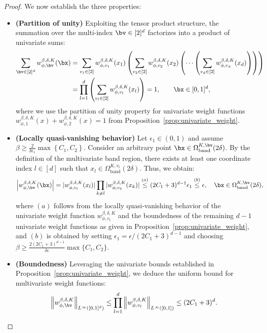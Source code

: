 \documentclass[11pt]{article}
\begin{document}
\begin{proof}
    We now establish the three properties: 
    \begin{itemize}
        \item \textbf{(Partition of unity)} Exploiting the tensor product structure, the summation over the multi-index $\bv \in [2]^d$ factorizes into a product of univariate sums:
        \begin{equation*}
            \begin{aligned}
                \sum_{\bv \in [2]^d} w_{\phi,\bv}^{\beta, \delta, K}(\bx) & = \sum_{v_1 \in [2]} w_{\phi, v_1}^{\beta, \delta, K}(x_1) \left( \sum_{v_2 \in [2]} w_{\phi, v_2}^{\beta, \delta, K}(x_2) \left( \cdots \left(\sum_{v_d \in [2]} w_{\phi, v_d}^{\beta, \delta, K}(x_d)  \right)\right) \right) \\
                & = \prod_{l=1}^d \left(\sum_{v_l \in [2]} w_{\phi, v_l}^{\beta, \delta, K}(x_l)\right) = 1, \qquad \bx \in [0,1]^d,
            \end{aligned}
        \end{equation*}
        where we use the partition of unity property for univariate weight functions $w_{\phi, 1}^{\beta, \delta, K}(x) + w_{\phi, 2}^{\beta, \delta, K}(x) = 1$ from Proposition~\ref{prop:univariate_weight}.
        \item \textbf{(Locally quasi-vanishing behavior)} Let $\epsilon_1 \in (0,1)$ and assume $\beta \ge \frac{2}{\delta \epsilon_1} \max \left\{ C_1,C_2 \right\}$. Consider an arbitrary point $\bx \in \Omega_{\mathrm{band}}^{K,\bv}(2 \delta)$. By the definition of the multivariate band region, there exists at least one coordinate index $l \in [d]$ such that $x_l \in \Omega_{\mathrm{band}}^{K, v_l}(2 \delta)$. Thus, we obtain:
        \begin{equation*}
            \left| w_{\phi,\bv}^{\beta, \delta, K}(\bx)\right| = |w_{\phi,v_l}^{\beta, \delta, K }(x_l)| \prod_{k \neq l} |w_{\phi,v_k}^{\beta, \delta, K }(x_k)| \overset{(a)}{\leq} (2C_1+3)^{d-1} \epsilon_1 \overset{(b)}{\leq} \epsilon, \quad \bx \in \Omega_{\mathrm{band}}^{K, \bv}(2 \delta),
        \end{equation*}
        where $(a)$ follows from the locally quasi-vanishing behavior of the univariate weight function  $w_{\phi, v_l}^{\beta, \delta, K}$ and the boundedness of the remaining $d-1$ univariate weight functions as given in Proposition~\ref{prop:univariate_weight}, and $(b)$ is obtained by setting $\epsilon_1 = \epsilon / (2C_1 + 3)^{d-1}$ and choosing $\beta \ge \frac{2(2C_1+3)^{d-1}}{\delta \epsilon} \max\{C_1,C_2\}$.
        \item \textbf{(Boundedness)} Leveraging the univariate bounds established in Proposition~\ref{prop:univariate_weight}, we deduce the uniform bound for multivariate weight functions:
        \begin{equation*}
            \left\|w_{\phi, \bv}^{\beta, \delta, K}\right\|_{L^{\infty}([0,1]^d)} \leq \prod_{l=1}^d \left\| w_{\phi. v_{l}}^{\beta, \delta, K}\right\|_{L^{\infty}([0,1])}\leq(2 C_1 + 3)^d.
        \end{equation*}
    \end{itemize}
\end{proof}
\end{document}
